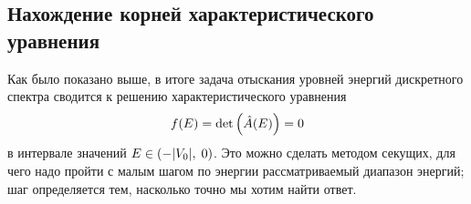 \documentclass[10pt]{article}
\begin{document}
\subsection{Нахождение корней характеристического уравнения}

Как было показано выше, в итоге задача отыскания уровней энергий дискретного спектра сводится к решению характеристического уравнения
\begin{equation}
    f(E) = \det\qty(\hat A(E)) = 0
\end{equation}
в интервале значений $E \in \qty(-\abs{V_0},\; 0)$. Это можно сделать методом секущих, для чего надо пройти с малым шагом по энергии рассматриваемый диапазон энергий; шаг определяется тем, насколько точно мы хотим найти ответ.
\end{document}
